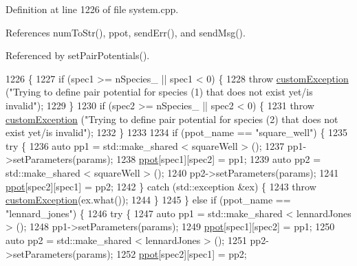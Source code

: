 Definition at line 1226 of file system.\-cpp.



References num\-To\-Str(), ppot, send\-Err(), and send\-Msg().



Referenced by set\-Pair\-Potentials().


\begin{DoxyCode}
1226                                                                                                            
                                                                         \{
1227     \textcolor{keywordflow}{if} (spec1 >= nSpecies\_ || spec1 < 0) \{
1228         \textcolor{keywordflow}{throw} \hyperlink{classcustom_exception}{customException} (\textcolor{stringliteral}{"Trying to define pair potential for species (1) that does
       not exist yet/is invalid"});
1229     \}
1230     \textcolor{keywordflow}{if} (spec2 >= nSpecies\_ || spec2 < 0) \{
1231         \textcolor{keywordflow}{throw} \hyperlink{classcustom_exception}{customException} (\textcolor{stringliteral}{"Trying to define pair potential for species (2) that does
       not exist yet/is invalid"});
1232     \}
1233 
1234     \textcolor{keywordflow}{if} (ppot\_name == \textcolor{stringliteral}{"square\_well"}) \{
1235         \textcolor{keywordflow}{try} \{
1236             \textcolor{keyword}{auto} pp1 = std::make\_shared < squareWell > ();
1237             pp1->setParameters(params);
1238             \hyperlink{classsim_system_ad2e290b5963f132e6a3a56cee35c8e9f}{ppot}[spec1][spec2] = pp1;
1239             \textcolor{keyword}{auto} pp2 = std::make\_shared < squareWell > ();
1240             pp2->setParameters(params);
1241             \hyperlink{classsim_system_ad2e290b5963f132e6a3a56cee35c8e9f}{ppot}[spec2][spec1] = pp2;
1242         \} \textcolor{keywordflow}{catch} (std::exception &ex) \{
1243             \textcolor{keywordflow}{throw} \hyperlink{classcustom_exception}{customException}(ex.what());
1244         \}
1245     \} \textcolor{keywordflow}{else} \textcolor{keywordflow}{if} (ppot\_name == \textcolor{stringliteral}{"lennard\_jones"}) \{
1246         \textcolor{keywordflow}{try} \{
1247             \textcolor{keyword}{auto} pp1 = std::make\_shared < lennardJones > ();
1248             pp1->setParameters(params);
1249             \hyperlink{classsim_system_ad2e290b5963f132e6a3a56cee35c8e9f}{ppot}[spec1][spec2] = pp1;
1250             \textcolor{keyword}{auto} pp2 = std::make\_shared < lennardJones > ();
1251             pp2->setParameters(params);
1252             \hyperlink{classsim_system_ad2e290b5963f132e6a3a56cee35c8e9f}{ppot}[spec2][spec1] = pp2;

\end{DoxyCode}
